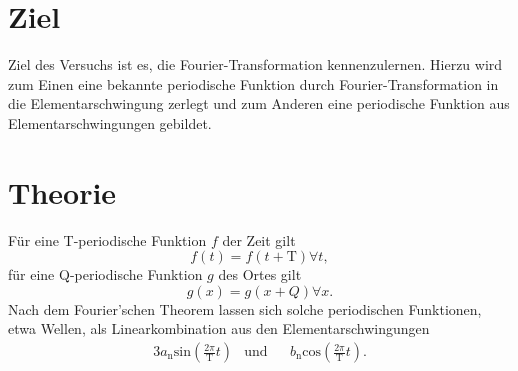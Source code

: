 \section*{Ziel}
Ziel des Versuchs ist es, die Fourier-Transformation kennenzulernen. 
Hierzu wird zum Einen eine bekannte periodische Funktion durch Fourier-Transformation in die Elementarschwingung zerlegt und 
zum Anderen eine periodische Funktion aus Elementarschwingungen gebildet.
\section{Theorie}
\label{sec:Theorie}

Für eine T-periodische Funktion $f$ der Zeit gilt
\begin{equation}
	f(t) = f(t+\mathup{T}) \forall t, 
\end{equation}
für eine Q-periodische Funktion $g$ des Ortes gilt
\begin{equation}
	g(x) = g(x+Q) \forall x. 
\end{equation}
Nach dem Fourier'schen Theorem lassen sich solche periodischen Funktionen, etwa Wellen, als Linearkombination aus den Elementarschwingungen
\begin{alignat}{3}
	a_\text{n}\text{sin}(\frac{2π}{\mathup{T}}t) &\text{und} && b_\text{n}\text{cos}(\frac{2π}{\mathup{T}}t) .
\end{alignat}